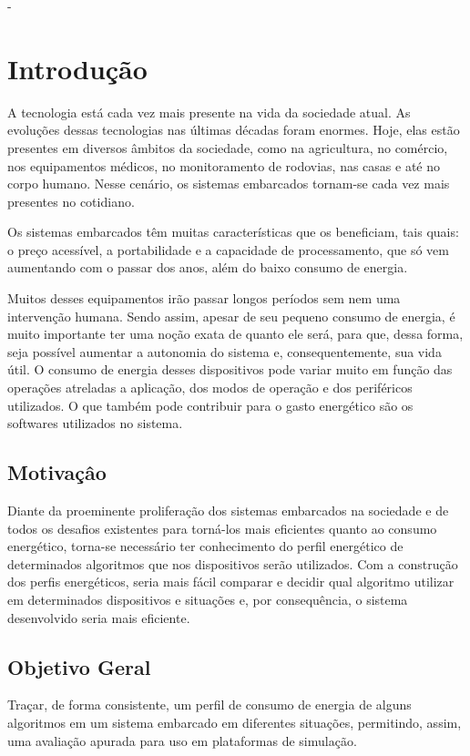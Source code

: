 -\chapter{Introdução}\label{CAP:introducao}

A tecnologia está cada vez mais presente na vida da sociedade atual. As evoluções dessas tecnologias nas últimas décadas foram enormes. Hoje, elas estão presentes em diversos âmbitos da sociedade, como na agricultura, no comércio, nos equipamentos médicos, no monitoramento de rodovias, nas casas e até no corpo humano. Nesse cenário, os sistemas embarcados tornam-se cada vez mais presentes no cotidiano.

Os sistemas embarcados têm muitas características que os beneficiam, tais quais: o preço acessível, a portabilidade e a capacidade de processamento, que só vem aumentando com o passar dos anos, além do baixo consumo de energia. 
            
Muitos desses equipamentos irão passar longos períodos sem nem uma intervenção humana. Sendo assim, apesar de seu pequeno consumo de energia, é muito importante ter uma noção exata de quanto ele será, para que, dessa forma, seja possível aumentar a autonomia do sistema e, consequentemente, sua vida útil. O consumo de energia desses dispositivos pode variar muito em função das operações atreladas a aplicação, dos modos de operação e dos periféricos utilizados. O que também pode contribuir para o gasto energético são os softwares utilizados no sistema.	
      
\section{Motivaçâo}
Diante da proeminente proliferação dos sistemas embarcados na sociedade e de todos os desafios existentes para torná-los mais eficientes quanto ao consumo energético, torna-se necessário ter conhecimento do perfil energético de determinados algoritmos que nos dispositivos serão utilizados. Com a construção dos perfis energéticos, seria mais fácil comparar e decidir qual algoritmo utilizar em determinados dispositivos e situações e, por consequência, o sistema desenvolvido seria mais eficiente.

\section{Objetivo Geral}
Traçar, de forma consistente, um perfil de consumo de energia de alguns algoritmos em um sistema embarcado em diferentes situações, permitindo, assim, uma avaliação apurada para uso em plataformas de simulação.

